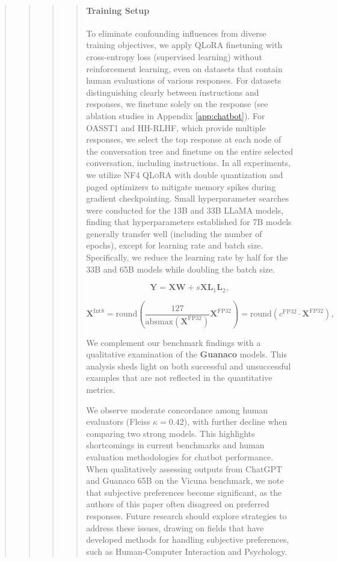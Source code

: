 \begin{quote}
\begin{quote}
\begin{quote}
\begin{quote}
\paragraph{Training Setup} To eliminate confounding influences from diverse training objectives, we apply QLoRA finetuning with cross-entropy loss (supervised learning) without reinforcement learning, even on datasets that contain human evaluations of various responses. For datasets distinguishing clearly between instructions and responses, we finetune solely on the response (see ablation studies in Appendix \ref{app:chatbot}). For OASST1 and HH-RLHF, which provide multiple responses, we select the top response at each node of the conversation tree and finetune on the entire selected conversation, including instructions. In all experiments, we utilize NF4 \textsc{QLoRA} with double quantization and paged optimizers to mitigate memory spikes during gradient checkpointing. Small hyperparameter searches were conducted for the 13B and 33B LLaMA models, finding that hyperparameters established for 7B models generally transfer well (including the number of epochs), except for learning rate and batch size. Specifically, we reduce the learning rate by half for the 33B and 65B models while doubling the batch size.

\begin{equation}
    \mathbf{Y} = \mathbf{X}\mathbf{W} + s\mathbf{X}\mathbf{L}_1\mathbf{L}_2,
\end{equation}

\begin{equation}
    \mathbf{X}^{ \text{Int8}} = \text{round}\left( \frac{127}{{\text{absmax}}(\mathbf{X}^{{\text{FP32}}})}\mathbf{X}^{{\text{FP32}}} \right) = \text{round}(c^{\text{FP32}}\cdot \mathbf{X}^{{\text{FP32}}}),
\end{equation}

We complement our benchmark findings with a qualitative examination of the \textbf{Guanaco} models. This analysis sheds light on both successful and unsuccessful examples that are not reflected in the quantitative metrics.

We observe moderate concordance among human evaluators (Fleiss $\kappa=0.42$), with further decline when comparing two strong models. This highlights shortcomings in current benchmarks and human evaluation methodologies for chatbot performance. When qualitatively assessing outputs from ChatGPT and {Guanaco} 65B on the Vicuna benchmark, we note that subjective preferences become significant, as the authors of this paper often disagreed on preferred responses. Future research should explore strategies to address these issues, drawing on fields that have developed methods for handling subjective preferences, such as Human-Computer Interaction and Psychology.


\end{quote}
\end{quote}
\end{quote}
\end{quote}
